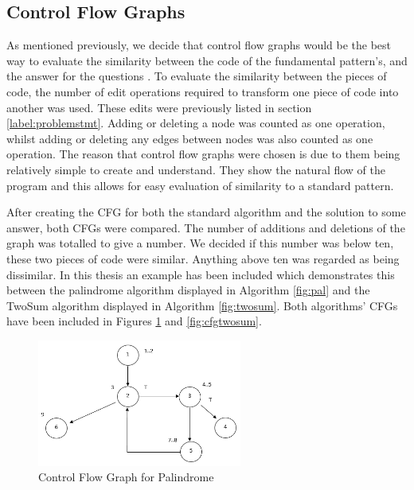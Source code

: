 \documentclass[10pt,twocolumn,hidelinks]{IEEEtran}
\begin{document}
\subsection{Control Flow Graphs}
\label{label:CFG}
As mentioned previously, we decide that control flow graphs would be the best way to evaluate the similarity between the code of the fundamental pattern’s, and the answer for the questions \cite{softwaretesting}. To evaluate the similarity between the pieces of code, the number of edit operations required to transform one piece of code into another was used. These edits were previously listed in section \ref{label:problemstmt}. Adding or deleting a node was counted as one operation, whilst adding or deleting any edges between nodes was also counted as one operation. The reason that control flow graphs were chosen is due to them being relatively simple to create and understand. They show the natural flow of the program and this allows for easy evaluation of similarity to a standard pattern.
\par After creating the CFG for both the standard algorithm and the solution to some answer, both CFGs were compared. The number of additions and deletions of the graph was totalled to give a number. We decided if this number was below ten, these two pieces of code were similar. Anything above ten was regarded as being dissimilar. In this thesis an example has been included which demonstrates this between the palindrome algorithm displayed in Algorithm \ref{fig:pal} and the TwoSum algorithm displayed in Algorithm \ref{fig:twosum}. Both algorithms' CFGs have been included in Figures \ref{fig:cfgpal} and \ref{fig:cfgtwosum}. 
 \begin{figure}[h]
\includegraphics[width=0.6\textwidth]{CFGPalindrome.png}
\caption{Control Flow Graph for Palindrome}
\label{fig:cfgpal}
\end{figure}
\end{document}
